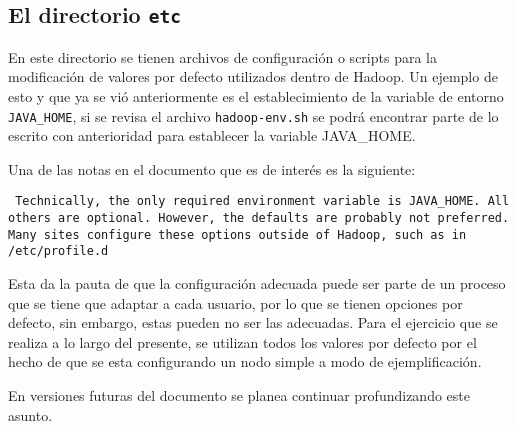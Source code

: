 \subsection*{El directorio {\tt etc}}

En este directorio se tienen archivos de configuración o scripts para la
modificación de valores por defecto utilizados dentro de Hadoop. Un ejemplo de
esto y que ya se vió anteriormente es el establecimiento de la variable de 
entorno {\tt JAVA\_HOME}, si se revisa el archivo {\tt hadoop-env.sh} se podrá
encontrar parte de lo escrito con anterioridad para establecer la variable
JAVA\_HOME.

Una de las notas en el documento que es de interés es la siguiente:

\begin{tcolorbox}
  {\tt
    Technically, the only required environment variable is JAVA\_HOME.
    All others are optional.  However, the defaults are probably not 
    preferred.  Many sites configure these options outside of Hadoop,
    such as in /etc/profile.d
  }
\end{tcolorbox}

Esta da la pauta de que la configuración adecuada puede ser parte de un
proceso que se tiene que adaptar a cada usuario, por lo que se tienen opciones
por defecto, sin embargo, estas pueden no ser las adecuadas. Para el ejercicio
que se realiza a lo largo del presente, se utilizan todos los valores por
defecto por el hecho de que se esta configurando un nodo simple a modo de
ejemplificación.

En versiones futuras del documento se planea continuar profundizando este asunto.
